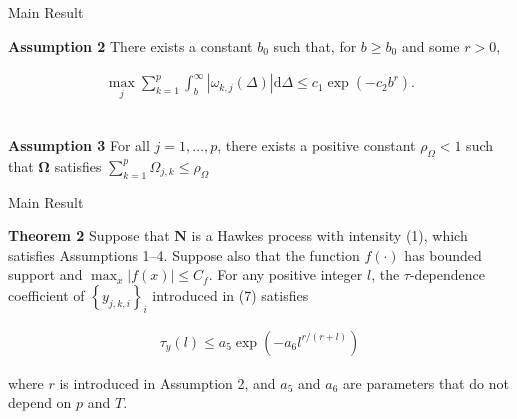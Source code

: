 \documentclass{beamer}		%
\newcommand{\dd}{\mathrm{d}}
\begin{document}
\begin{frame}{Main Result}

\textbf{Assumption 2} There exists a constant $b_0$ such that, for $b \ge b_0$ and some $r > 0$,

\begin{align*}
\max_j \sum_{k=1}^p \int_b^\infty |\omega_{k,j}(\Delta)| \dd \Delta \leq c_1 \exp (-c_2 b^r).
\end{align*}

~\\
\textbf{Assumption 3} For all $j = 1, \ldots, p$, there exists a positive constant $\rho_{\Omega} < 1$ such that $\bm{\Omega}$ satisfies $\sum_{k=1}^p \Omega_{j,k} \leq \rho_{\Omega}$


\end{frame}








\begin{frame}{Main Result}

\textbf{Theorem 2} Suppose that $\bm{N}$ is a Hawkes process with intensity (1), which satisfies Assumptions 1–4. Suppose also that the function $f(\cdot)$ has bounded support and $ \max_x |f(x)| \leq C_f$. For any positive integer $l$, the $\tau$-dependence coefficient of $\left\{y_{j,k,i} \right\}_i $ introduced in (7) satisfies 

\begin{align}
\tau_y(l) \leq a_5 \exp(-a_6 l^{r/(r+l)} )
\end{align}

where $r$ is introduced in Assumption 2, and $a_5$ and $a_6$ are parameters that do not depend on $p$ and $T$.

\end{frame}
\end{document}

